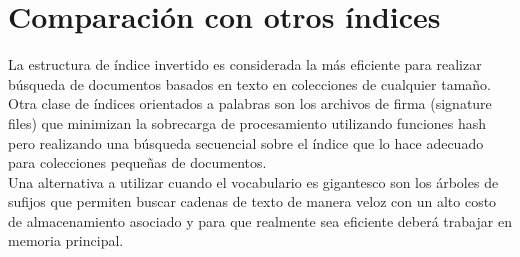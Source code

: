 \section{Comparación con otros índices}
La estructura de índice invertido es considerada la más eficiente para realizar búsqueda de documentos basados en texto en colecciones de cualquier tamaño. \\
Otra clase de índices orientados a palabras son los archivos de firma (signature files) que minimizan la sobrecarga de procesamiento utilizando funciones hash pero realizando una búsqueda secuencial sobre el índice que lo hace adecuado para colecciones pequeñas de documentos. \\
Una alternativa a utilizar cuando el vocabulario es gigantesco son los árboles de sufijos que permiten buscar cadenas de texto de manera veloz con un alto costo de almacenamiento asociado y para que realmente sea eficiente deberá trabajar en memoria principal.